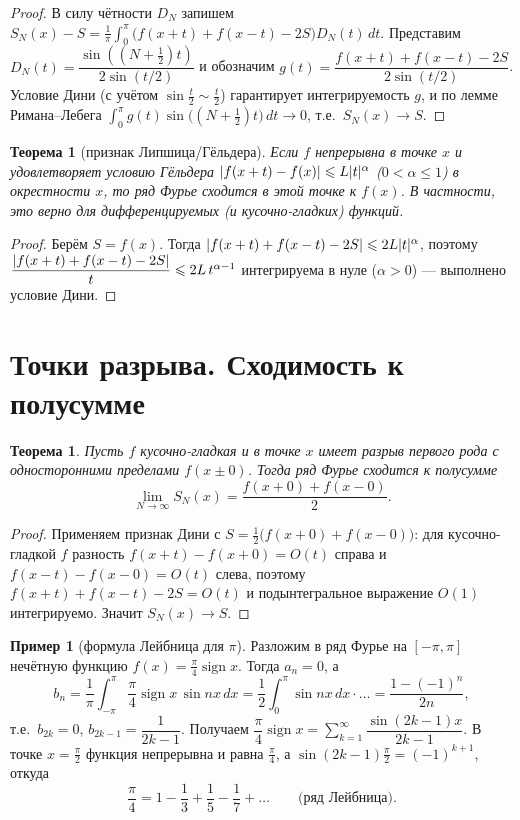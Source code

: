 \documentclass[11pt,a4paper]{article}
\theoremstyle{definition}
\newtheorem{example}[definition]{Пример}
\theoremstyle{plain}
\newtheorem{theorem}[definition]{Теорема}
\DeclareMathOperator{\sign}{sign}
\newcommand{\dx}{\,dx}
\newcommand{\dt}{\,dt}
\renewcommand{\le}{\leqslant}
\DeclarePairedDelimiter{\abs}{\lvert}{\rvert}
\begin{document}
\begin{proof}
В силу чётности $D_N$ запишем
$S_N(x)-S=\tfrac1\pi\int_0^{\pi}\bigl(f(x+t)+f(x-t)-2S\bigr)D_N(t)\dt$. Представим
$D_N(t)=\dfrac{\sin((N+\frac12)t)}{2\sin(t/2)}$ и обозначим
$g(t)=\dfrac{f(x+t)+f(x-t)-2S}{2\sin(t/2)}$. Условие Дини (с учётом $\sin\tfrac t2\sim\tfrac t2$)
гарантирует интегрируемость $g$, и по лемме Римана--Лебега
$\int_0^\pi g(t)\sin\bigl((N+\tfrac12)t\bigr)\dt\to0$, т.е.\ $S_N(x)\to S$.
\end{proof}

\begin{theorem}[признак Липшица/Гёльдера]
Если $f$ непрерывна в точке $x$ и удовлетворяет условию Гёльдера
$\abs{f(x+t)-f(x)}\le L\abs t^{\alpha}$ ($0<\alpha\le1$) в окрестности $x$, то ряд Фурье сходится
в этой точке к $f(x)$. В частности, это верно для дифференцируемых (и кусочно-гладких) функций.
\end{theorem}

\begin{proof}
Берём $S=f(x)$. Тогда $\abs{f(x+t)+f(x-t)-2S}\le 2L\abs t^\alpha$, поэтому
$\dfrac{\abs{f(x+t)+f(x-t)-2S}}{t}\le 2L\,t^{\alpha-1}$ интегрируема в нуле ($\alpha>0$) —
выполнено условие Дини.
\end{proof}

\section{Точки разрыва. Сходимость к полусумме}

\begin{theorem}
Пусть $f$ кусочно-гладкая и в точке $x$ имеет разрыв первого рода с односторонними пределами
$f(x\pm0)$. Тогда ряд Фурье сходится к полусумме
\[
  \lim_{N\to\infty}S_N(x)=\frac{f(x+0)+f(x-0)}{2}.
\]
\end{theorem}

\begin{proof}
Применяем признак Дини с $S=\tfrac12\bigl(f(x+0)+f(x-0)\bigr)$: для кусочно-гладкой $f$ разность
$f(x+t)-f(x+0)=O(t)$ справа и $f(x-t)-f(x-0)=O(t)$ слева, поэтому
$f(x+t)+f(x-t)-2S=O(t)$ и подынтегральное выражение $O(1)$ интегрируемо. Значит $S_N(x)\to S$.
\end{proof}

\begin{example}[формула Лейбница для $\pi$]
Разложим в ряд Фурье на $[-\pi,\pi]$ нечётную функцию $f(x)=\tfrac\pi4\sign x$. Тогда $a_n=0$, а
\[
  b_n=\frac1\pi\int_{-\pi}^{\pi}\frac\pi4\sign x\,\sin nx\dx
   =\frac12\int_0^{\pi}\sin nx\dx\cdot\ldots=\frac{1-(-1)^n}{2n},
\]
т.е.\ $b_{2k}=0$, $b_{2k-1}=\dfrac{1}{2k-1}$. Получаем
$\dfrac\pi4\sign x=\sum_{k=1}^\infty\dfrac{\sin(2k-1)x}{2k-1}$. В точке $x=\tfrac\pi2$ функция
непрерывна и равна $\tfrac\pi4$, а $\sin(2k-1)\tfrac\pi2=(-1)^{k+1}$, откуда
\[
  \frac\pi4=1-\frac13+\frac15-\frac17+\dots \qquad\text{(ряд Лейбница).}
\]
\end{example}
\end{document}
